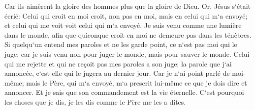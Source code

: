 \verse Car ils aimèrent la gloire des hommes plus que la gloire de Dieu. 
\verse Or, Jésus s`était écrié: Celui qui croit en moi croit, non pas en moi, mais en celui qui m`a envoyé; 
\verse et celui qui me voit voit celui qui m`a envoyé. 
\verse Je suis venu comme une lumière dans le monde, afin que quiconque croit en moi ne demeure pas dans les ténèbres. 
\verse Si quelqu`un entend mes paroles et ne les garde point, ce n`est pas moi qui le juge; car je suis venu non pour juger le monde, mais pour sauver le monde. 
\verse Celui qui me rejette et qui ne reçoit pas mes paroles a son juge; la parole que j`ai annoncée, c`est elle qui le jugera au dernier jour. 
\verse Car je n`ai point parlé de moi-même; mais le Père, qui m`a envoyé, m`a prescrit lui-même ce que je dois dire et annoncer. 
\verse Et je sais que son commandement est la vie éternelle. C`est pourquoi les choses que je dis, je les dis comme le Père me les a dites. 


